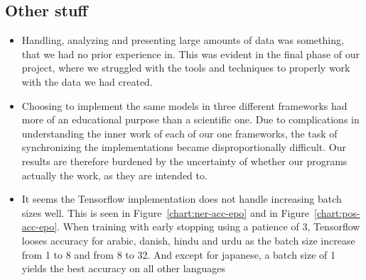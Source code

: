 \subsection{Other stuff}

\begin{itemize}
    \item Handling, analyzing and presenting large amounts of data was
        something, that we had no prior experience in. This was evident in the
        final phase of our project, where we struggled with the tools and
        techniques to properly work with the data we had created.
    \item Choosing to implement the same models in three different frameworks
        had more of an educational purpose than a scientific one. Due to
        complications in understanding the inner work of each of our one
        frameworks, the task of synchronizing the implementations became
        disproportionally difficult. Our results are therefore burdened by the
        uncertainty of whether our programs actually the work, as they are
        intended to.
    \item It seems the Tensorflow implementation does not handle increasing
        batch sizes well. This is seen in Figure~\ref{chart:ner-acc-epo} and in
        Figure~\ref{chart:pos-acc-epo}. When training with early stopping using
        a patience of 3, Tensorflow looses accuracy for arabic, danish, hindu
        and urdu as the batch size increase from 1 to 8 and from 8 to 32. And
        except for japanese, a batch size of 1 yields the best accuracy on all
        other languages 
\end{itemize}

\pagebreak
